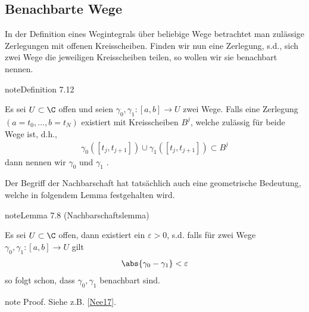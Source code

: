 \documentclass[letterpaper,10pt,german]{jupyterBook}
\begin{document}
\subsection{Benachbarte Wege}
\label{\detokenize{complexanalysis/cauchyintegral:benachbarte-wege}}
\sphinxAtStartPar
In der Definition eines Wegintegrals über beliebige Wege betrachtet man zulässige Zerlegungen mit offenen Kreisscheiben. Finden wir nun eine Zerlegung, s.d., sich zwei Wege die jeweiligen Kreisscheiben teilen, so wollen wir sie benachbart nennen.
\label{complexanalysis/cauchyintegral:definition-0}
\begin{sphinxadmonition}{note}{Definition 7.12}



\sphinxAtStartPar
Es sei \(U\subset \C\) offen und seien \(\gamma_0,\gamma_1:[a,b]\to U\) zwei Wege. Falls eine Zerlegung \((a=t_0,\ldots,b=t_N)\) existiert mit Kreisscheiben \(B^j\), welche zulässig für beide Wege ist, d.h.,
\begin{equation*}
\begin{split}\gamma_0([t_j, t_{j+1}])\cup \gamma_1([t_j,t_{j+1}]) \subset B^j\end{split}
\end{equation*}
\sphinxAtStartPar
dann nennen wir \(\gamma_0\) und \(\gamma_1\) .
\end{sphinxadmonition}

\sphinxAtStartPar
Der Begriff der Nachbarschaft hat tatsächlich auch eine geometrische Bedeutung, welche in folgendem Lemma festgehalten wird.
\label{complexanalysis/cauchyintegral:lem:closelem}
\begin{sphinxadmonition}{note}{Lemma 7.8 (Nachbarschaftslemma)}



\sphinxAtStartPar
Es sei \(U\subset\C\) offen, dann existiert ein \(\varepsilon>0\), s.d. falls für zwei Wege \(\gamma_0,\gamma_1:[a,b]\to U\) gilt
\begin{equation*}
\begin{split}\abs{\gamma_0 - \gamma_1} < \varepsilon\end{split}
\end{equation*}
\sphinxAtStartPar
so folgt schon, dass \(\gamma_0,\gamma_1\) benachbart sind.
\end{sphinxadmonition}

\begin{sphinxadmonition}{note}
\sphinxAtStartPar
Proof. Siehe z.B. {[}\hyperlink{cite.references:id13}{Nee17}{]}.
\end{sphinxadmonition}
\end{document}
